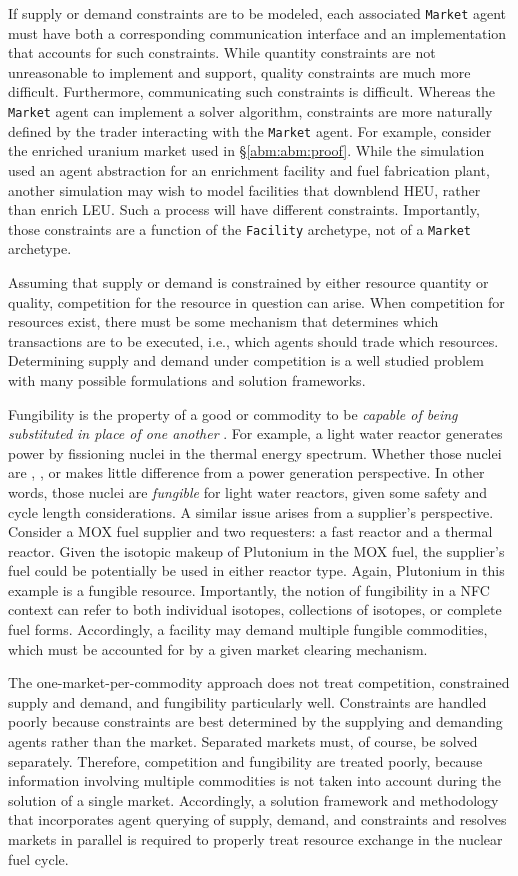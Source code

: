 If supply or demand constraints are to be modeled, each
associated \texttt{Market} agent must have both a corresponding communication
interface and an implementation that accounts for such constraints. While
quantity constraints are not unreasonable to implement and support, quality
constraints are much more difficult. Furthermore, communicating such constraints
is difficult. Whereas the \texttt{Market} agent can implement a solver algorithm,
constraints are more naturally defined by the trader interacting with the
\texttt{Market} agent. For example, consider the enriched uranium market used in
\S \ref{abm:abm:proof}. While the simulation used an agent abstraction for an
enrichment facility and fuel fabrication plant, another simulation may wish to
model facilities that downblend HEU, rather than enrich LEU. Such a process will
have different constraints. Importantly, those constraints are a function of the
\texttt{Facility} archetype, not of a \texttt{Market} archetype.

Assuming that supply or demand is constrained by either resource quantity or
quality, competition for the resource in question can arise.  When competition
for resources exist, there must be some mechanism that determines which
transactions are to be executed, i.e., which agents should trade which
resources. Determining supply and demand under competition is a well studied
problem with many possible formulations and solution frameworks.

Fungibility is the property of a good or commodity to be \textit{capable of
  being substituted in place of one another} \cite{MerriamWebster2014}. For
example, a light water reactor generates power by fissioning nuclei in the
thermal energy spectrum. Whether those nuclei are , ,
or  makes little difference from a power generation perspective. In
other words, those nuclei are \textit{fungible} for light water reactors, given
some safety and cycle length considerations. A similar issue arises from a
supplier's perspective. Consider a MOX fuel supplier and two requesters: a fast
reactor and a thermal reactor. Given the isotopic makeup of Plutonium in the MOX
fuel, the supplier's fuel could be potentially be used in either reactor
type. Again, Plutonium in this example is a fungible resource. Importantly, the
notion of fungibility in a NFC context can refer to both individual isotopes,
collections of isotopes, or complete fuel forms. Accordingly, a facility may
demand multiple fungible commodities, which must be accounted for by a given
market clearing mechanism.

The one-market-per-commodity approach does not treat competition, constrained
supply and demand, and fungibility particularly well. Constraints are handled
poorly because constraints are best determined by the supplying and demanding
agents rather than the market. Separated markets must, of course, be solved
separately. Therefore, competition and fungibility are treated poorly, because
information involving multiple commodities is not taken into account during the
solution of a single market. Accordingly, a solution framework and methodology
that incorporates agent querying of supply, demand, and constraints and resolves
markets in parallel is required to properly treat resource exchange in the
nuclear fuel cycle.
